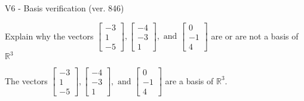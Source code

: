 \begin{exercise}
  \begin{exerciseTitle}V6 - Basis verification (ver. 846)\end{exerciseTitle}
  \begin{exerciseStatement}
    Explain why the vectors \(\left[\begin{array}{r}
-3 \\
1 \\
-5
\end{array}\right] , \left[\begin{array}{r}
-4 \\
-3 \\
1
\end{array}\right] , \text{ and } \left[\begin{array}{r}
0 \\
-1 \\
4
\end{array}\right]\) are or are not a basis of \(\mathbb{R}^3\)	


  \end{exerciseStatement}
  \begin{exerciseAnswer}
   The vectors \(\left[\begin{array}{r}
-3 \\
1 \\
-5
\end{array}\right] , \left[\begin{array}{r}
-4 \\
-3 \\
1
\end{array}\right] , \text{ and } \left[\begin{array}{r}
0 \\
-1 \\
4
\end{array}\right]\) 
  	 are  a basis of \(\mathbb{R}^3\).
  


  \end{exerciseAnswer}
\end{exercise}
